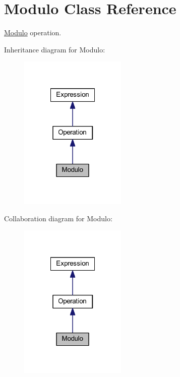 \hypertarget{class_modulo}{\section{Modulo Class Reference}
\label{class_modulo}
}


\hyperlink{class_modulo}{Modulo} operation.  




Inheritance diagram for Modulo\-:\nopagebreak
\begin{figure}[H]
\begin{center}
\leavevmode
\includegraphics[width=144pt]{class_modulo__inherit__graph}
\end{center}
\end{figure}


Collaboration diagram for Modulo\-:\nopagebreak
\begin{figure}[H]
\begin{center}
\leavevmode
\includegraphics[width=144pt]{class_modulo__coll__graph}
\end{center}
\end{figure}
